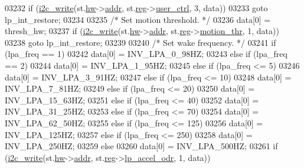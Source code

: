 \begin{DoxyCode}
{{{{{{{{{{{{{{{{{{{{{{{{{{{{{{{{{{03232         \textcolor{keywordflow}{if} (\hyperlink{_i2_c_8c_ac0f145afe8d662af199043939f4398d6}{i2c\_write}(st.\hyperlink{structgyro__state__s_a5bac30a96752691e4cc723735060e360}{hw}->\hyperlink{structhw__s_a4c34a946600e9d68b6355d23f54d291b}{addr}, st.\hyperlink{structgyro__state__s_ae857e1285c583b7438a208edd691a38e}{reg}->\hyperlink{structgyro__reg__s_ad8384710853dc1f9580b9ff19e87efbc}{user\_ctrl}, 3, data))
03233             \textcolor{keywordflow}{goto} lp\_int\_restore;
03234 
03235         \textcolor{comment}{/* Set motion threshold. */}
03236         data[0] = thresh\_hw;
03237         \textcolor{keywordflow}{if} (\hyperlink{_i2_c_8c_ac0f145afe8d662af199043939f4398d6}{i2c\_write}(st.\hyperlink{structgyro__state__s_a5bac30a96752691e4cc723735060e360}{hw}->\hyperlink{structhw__s_a4c34a946600e9d68b6355d23f54d291b}{addr}, st.\hyperlink{structgyro__state__s_ae857e1285c583b7438a208edd691a38e}{reg}->\hyperlink{structgyro__reg__s_a31322df7c5727b98480d1fcb18e040c5}{motion\_thr}, 1, data))
03238             \textcolor{keywordflow}{goto} lp\_int\_restore;
03239 
03240         \textcolor{comment}{/* Set wake frequency. */}
03241         \textcolor{keywordflow}{if} (lpa\_freq == 1)
03242             data[0] = INV\_LPA\_0\_98HZ;
03243         \textcolor{keywordflow}{else} \textcolor{keywordflow}{if} (lpa\_freq == 2)
03244             data[0] = INV\_LPA\_1\_95HZ;
03245         \textcolor{keywordflow}{else} \textcolor{keywordflow}{if} (lpa\_freq <= 5)
03246             data[0] = INV\_LPA\_3\_91HZ;
03247         \textcolor{keywordflow}{else} \textcolor{keywordflow}{if} (lpa\_freq <= 10)
03248             data[0] = INV\_LPA\_7\_81HZ;
03249         \textcolor{keywordflow}{else} \textcolor{keywordflow}{if} (lpa\_freq <= 20)
03250             data[0] = INV\_LPA\_15\_63HZ;
03251         \textcolor{keywordflow}{else} \textcolor{keywordflow}{if} (lpa\_freq <= 40)
03252             data[0] = INV\_LPA\_31\_25HZ;
03253         \textcolor{keywordflow}{else} \textcolor{keywordflow}{if} (lpa\_freq <= 70)
03254             data[0] = INV\_LPA\_62\_50HZ;
03255         \textcolor{keywordflow}{else} \textcolor{keywordflow}{if} (lpa\_freq <= 125)
03256             data[0] = INV\_LPA\_125HZ;
03257         \textcolor{keywordflow}{else} \textcolor{keywordflow}{if} (lpa\_freq <= 250)
03258             data[0] = INV\_LPA\_250HZ;
03259         \textcolor{keywordflow}{else}
03260             data[0] = INV\_LPA\_500HZ;
03261         \textcolor{keywordflow}{if} (\hyperlink{_i2_c_8c_ac0f145afe8d662af199043939f4398d6}{i2c\_write}(st.\hyperlink{structgyro__state__s_a5bac30a96752691e4cc723735060e360}{hw}->\hyperlink{structhw__s_a4c34a946600e9d68b6355d23f54d291b}{addr}, st.\hyperlink{structgyro__state__s_ae857e1285c583b7438a208edd691a38e}{reg}->\hyperlink{structgyro__reg__s_a14a0bff136c827f3f58f619f8045788b}{lp\_accel\_odr}, 1, data))
}}}}}}}}}}}}}}}}}}}}}}}}}}}}}}}}}}
\end{DoxyCode}
